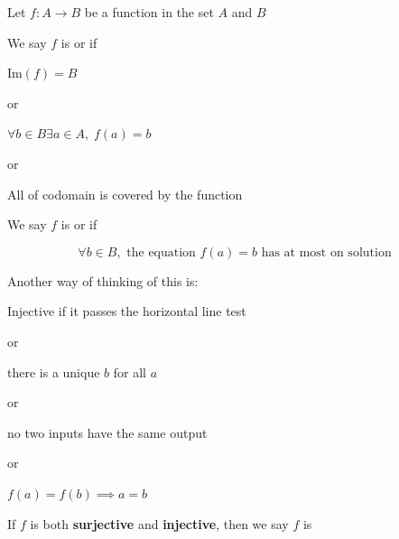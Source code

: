 \documentclass[../../Main.tex]{subfiles}
\begin{document}
\begin{definition}[Surjective]
    Let $f: A \rightarrow B$ be a function in the set $A$ and $B$

    We say $f$ is  or  if

    \begin{center}
        $ \text{Im}(f) = B $

        or

        $ \forall b \in B \exists a \in A, \; f(a) = b $

        or

        All of codomain is covered by the function
    \end{center}

\end{definition}

\begin{definition}[Injective]
    We say $f$ is  or  if 

    $$ \forall b \in B, \text{ the equation } f(a) = b \text{ has at most on solution}$$

    Another way of thinking of this is:

    \begin{center}
        Injective if it passes the horizontal line test

        or

        there is a unique $b$ for all $a$
        
        or

        no two inputs have the same output

        or

        $f(a) = f(b) \implies a = b$
    \end{center}
\end{definition}

\begin{definition}[Bijective]
    If $f$ is both \textbf{surjective} and \textbf{injective}, then we say $f$ is 
\end{definition}
\end{document}

